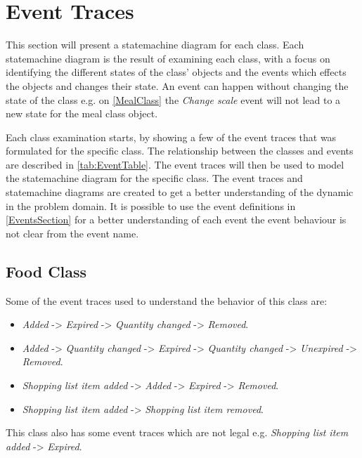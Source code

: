 \section{Event Traces} \label{EventTraces}
This section will present a statemachine diagram for each class. Each statemachine diagram is the result of examining each class, with a focus on identifying the different states of the class' objects and the events which effects the objects and changes their state. An event can happen without changing the state of the class e.g. on \cref{MealClass} the \textit{Change scale} event will not lead to a new state for the meal class object.  

Each class examination starts, by showing a few of the event traces that was formulated for the specific class. The relationship between the classes and events are described in \cref{tab:EventTable}. The event traces will then be used to model the statemachine diagram for the specific class. The event traces and statemachine diagrams are created to get a better understanding of the dynamic in the problem domain. It is possible to use the event definitions in \cref{EventsSection} for a better understanding of each event the event behaviour is not clear from the event name.   

\subsection{Food Class}
Some of the event traces used to understand the behavior of this class are:
\begin{itemize}
	\item \textit{Added} -> \textit{Expired} -> \textit{Quantity changed} -> \textit{Removed}.
	\item \textit{Added} -> \textit{Quantity changed} -> \textit{Expired} -> \textit{Quantity changed} -> \textit{Unexpired} -> \textit{Removed}.
	\item \textit{Shopping list item added} -> \textit{Added} -> \textit{Expired} -> \textit{Removed}.
	\item \textit{Shopping list item added} -> \textit{Shopping list item removed}.
\end{itemize}

This class also has some event traces which are not legal e.g. 
\textit{Shopping list item added} -> \textit{Expired}.

